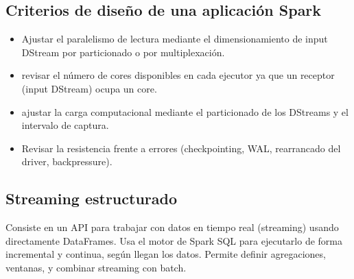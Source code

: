 \subsection{Criterios de diseño de una aplicación Spark}
\begin{itemize}
	\item Ajustar el paralelismo de lectura mediante el dimensionamiento de input DStream por particionado o por multiplexación.
	\item revisar el número de cores disponibles en cada ejecutor ya que un receptor (input DStream) ocupa un core.
	\item ajustar la carga computacional mediante el particionado de los DStreams y el intervalo de captura.
	\item Revisar la resistencia frente a errores (checkpointing, WAL, rearrancado del driver, backpressure).
\end{itemize}
\subsection{Streaming estructurado}
Consiste en un API para trabajar con datos en tiempo real (streaming) usando directamente DataFrames. Usa el motor de Spark SQL para ejecutarlo de forma incremental y continua, según llegan los datos. Permite definir agregaciones, ventanas, y combinar streaming con batch.\\\\


